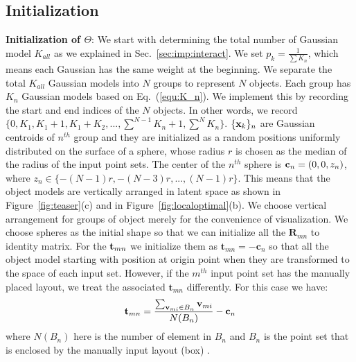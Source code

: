 \subsection{Initialization}
%
\textbf{Initialization of $\Theta$}: We start with determining the total number of Gaussian model $K_{all}$ as we explained in Sec.~\ref{sec:imp:interact}.
We set $p_k=\frac{1}{\sum K_n}$, which means each Gaussian has the same weight at the beginning. 
%
We separate the total $K_{all}$ Gaussian models into $N$ groups to represent $N$ objects. 
%
Each group has $K_n$ Gaussian models based on Eq.~(\ref{equ:K_n}). 
We implement this by recording the start and end indices of the $N$ objects. In other words, we record
$\{0,K_1,K_1+1,K_1+K_2,...,\sum^{N-1}K_n+1,\sum^N K_n\}$. $\{\mathbf{x}_k\}_n$ are Gaussian centroids of $n^{th}$ group and they are initialized as a random positions uniformly distributed on the surface of a sphere, whose radius $r$ is chosen as the median of the radius of the input point sets. 
%
The center of the $n^{th}$ sphere is $\mathbf{c}_n=(0,0,z_n)$, where $z_n\in \{-(N-1)r,-(N-3)r,...,(N-1)r\}$. 
%
This means that the object models are vertically arranged in latent space as shown in Figure~\ref{fig:teaser}(c) and in Figure~\ref{fig:localoptimal}(b). 
We choose vertical arrangement for groups of object merely for the convenience of visualization. 
%
We choose spheres as the initial shape so that we can initialize all the $\mathbf{R}_{mn}$ to identity matrix. 
%
For the $\mathbf{t}_{mn}$ we initialize them as $\mathbf{t}_{mn}=- \mathbf{c}_n$ so that all the object model starting with position at origin point when they are transformed to the space of each input set. 
%
However, if the $m^{th}$ input point set has the manually placed layout, we treat the associated $\mathbf{t}_{mn}$ differently. For this case we have:
\begin{equation}
	\label{equ:initt}
	\mathbf{t}_{mn}=\frac{\sum_{\mathbf{v}_{mi} \in B_n}\mathbf{v}_{mi}}{N(B_n)}-\mathbf{c}_n
\end{equation}
where $N(B_n)$ here is the number of element in $B_n$ and $B_n$ is the point set that is enclosed by the manually input layout (box) . 
 
